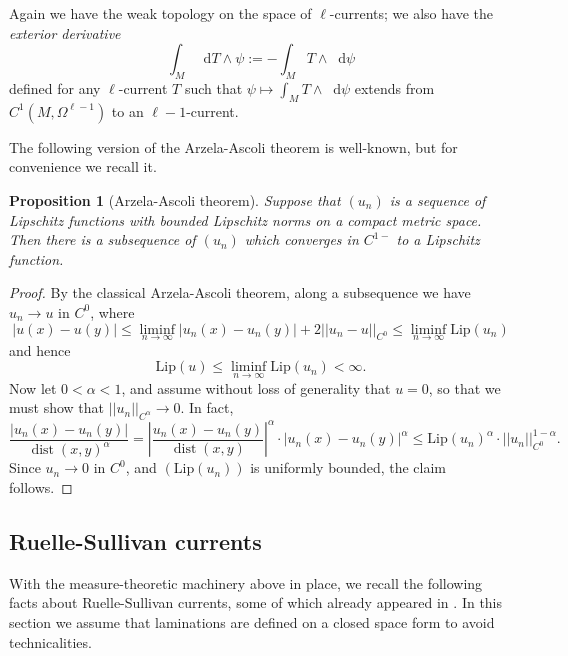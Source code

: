 \documentclass[reqno,11pt]{amsart}
\newcommand*\dif{\mathop{}\!\mathrm{d}}
\DeclareMathOperator{\dist}{dist}
\newcommand{\Lip}{\mathrm{Lip}}
\newcommand{\dfn}[1]{\emph{#1}\index{#1}}
\newtheorem{proposition}[theorem]{Proposition}
\theoremstyle{definition}
\numberwithin{equation}{section}
\begin{document}
Again we have the weak topology on the space of $\ell$-currents; we also have the \dfn{exterior derivative}
$$\int_M \dif T \wedge \psi := -\int_M T \wedge \dif \psi$$
defined for any $\ell$-current $T$ such that $\psi \mapsto \int_M T \wedge \dif \psi$ extends from $C^1(M, \Omega^{\ell - 1})$ to an $\ell - 1$-current.

The following version of the Arzela-Ascoli theorem is well-known, but for convenience we recall it.

\begin{proposition}[Arzela-Ascoli theorem]\label{AA Holder}
Suppose that $(u_n)$ is a sequence of Lipschitz functions with bounded Lipschitz norms on a compact metric space. Then there is a subsequence of $(u_n)$ which converges in $C^{1-}$ to a Lipschitz function.
\end{proposition}
\begin{proof}
By the classical Arzela-Ascoli theorem, along a subsequence we have $u_n \to u$ in $C^0$, where
$$|u(x) - u(y)| \leq \liminf_{n \to \infty} |u_n(x) - u_n(y)| + 2 ||u_n - u||_{C^0} \leq \liminf_{n \to \infty} \Lip(u_n)$$
and hence
$$\Lip(u) \leq \liminf_{n \to \infty} \Lip(u_n) < \infty.$$
Now let $0 < \alpha < 1$, and assume without loss of generality that $u = 0$, so that we must show that $||u_n||_{C^\alpha} \to 0$.
In fact,
$$\frac{|u_n(x) - u_n(y)|}{\dist(x, y)^\alpha} = \left|\frac{u_n(x) - u_n(y)}{\dist(x, y)}\right|^\alpha \cdot |u_n(x) - u_n(y)|^\alpha \leq \Lip(u_n)^\alpha \cdot ||u_n||_{C^0}^{1 - \alpha}.$$
Since $u_n \to 0$ in $C^0$, and $(\Lip(u_n))$ is uniformly bounded, the claim follows.
\end{proof}

\subsection{Ruelle-Sullivan currents}
With the measure-theoretic machinery above in place, we recall the following facts about Ruelle-Sullivan currents, some of which already appeared in \cite[\S8]{daskalopoulos2020transverse}.
In this section we assume that laminations are defined on a closed space form to avoid technicalities.
\end{document}

